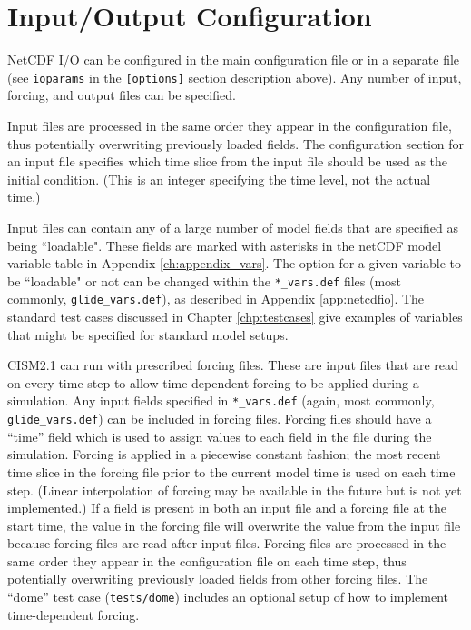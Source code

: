 \section{Input/Output Configuration}
\label{io-config}

NetCDF I/O can be configured in the main configuration file or in a separate file 
(see \texttt{ioparams} in the \texttt{[options]} section description above). 
Any number of input, forcing, and output files can be specified. 

Input files are processed in the same order they appear in the configuration file, 
thus potentially overwriting previously loaded fields.  The configuration section 
for an input file specifies which time slice from the input file should be used as
the initial condition.  (This is an integer specifying the time level, not
the actual time.)

Input files can contain any of a large number of model fields that are specified as being
``loadable". These fields are marked with asterisks in the netCDF model variable
table in Appendix \ref{ch:appendix_vars}. The option for a given variable to be ``loadable" 
or not can be changed within the \texttt{*\_vars.def} files (most commonly, \texttt{glide\_vars.def}),
as described in Appendix \ref{app:netcdfio}. 
The standard test cases discussed in Chapter \ref{chp:testcases} give examples
of variables that might be specified for standard model setups.    

CISM2.1 can run with prescribed forcing files.  These are input files that are read on every 
time step to allow time-dependent
forcing to be applied during a simulation.  Any input fields specified in
\texttt{*\_vars.def} (again, most commonly, \texttt{glide\_vars.def}) can be included
in forcing files.  Forcing files should have a ``time'' field which is used to 
assign values to each field in the file during the simulation.  Forcing is applied 
in a piecewise constant fashion; the most recent time slice in the forcing file prior
to the current model time is used on each time step.  (Linear interpolation of
forcing may be available in the future but is not yet implemented.)
If a field is present in both an input file and a
forcing file at the start time, the value in the forcing file will overwrite the value
from the input file because forcing files are read after input files.
Forcing files are processed in the same order they appear in the configuration file on each time step, 
thus potentially overwriting previously loaded fields from other
forcing files.  The ``dome'' test case (\texttt{tests/dome}) includes 
an optional setup of how to implement time-dependent forcing.

